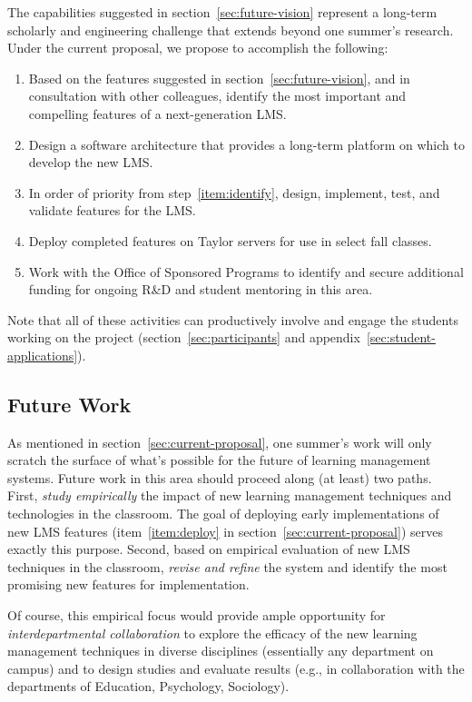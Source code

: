 \documentclass{article}
\begin{document}
The capabilities suggested in section~\ref{sec:future-vision}
represent a long-term scholarly and engineering challenge
that extends beyond one summer's research.
Under the current proposal,
we propose to accomplish the following:
\begin{enumerate}
\item\label{item:identify}
  Based on the features suggested in section~\ref{sec:future-vision},
  and in consultation with other colleagues,
  identify the most important and compelling features of
  a next-generation LMS.
\item Design a software architecture
  that provides a long-term platform on which to develop
  the new LMS.
\item In order of priority from step~\ref{item:identify},
  design, implement, test, and validate features for the LMS.
\item\label{item:deploy} Deploy completed features
  on Taylor servers for use in select fall classes.
\item Work with
  the Office of Sponsored Programs
  to identify and secure additional funding
  for ongoing R\&D and student mentoring in this area.
\end{enumerate}
Note that all of these activities can productively
involve and engage the students working on the project
(section~\ref{sec:participants} and appendix~\ref{sec:student-applications}).

\subsection{Future Work}
\label{sec:future-work}

As mentioned in section~\ref{sec:current-proposal},
one summer's work will only scratch the surface of what's
possible for the future of learning management systems.
Future work in this area should proceed along (at least) two paths.
First, \emph{study empirically} the impact of new learning management
techniques and technologies in the classroom.
The goal of deploying early implementations of new LMS features
(item~\ref{item:deploy} in section~\ref{sec:current-proposal})
serves exactly this purpose.
Second, based on empirical evaluation of new LMS techniques
in the classroom,
\emph{revise and refine} the system
and identify the most promising new features
for implementation.

Of course,
this empirical focus would provide
ample opportunity for
\emph{interdepartmental collaboration}
to explore the efficacy of the new learning management techniques
in diverse disciplines
(essentially any department on campus)
and to design studies and evaluate results
(e.g., in collaboration with the
departments of Education, Psychology, Sociology).
\end{document}
